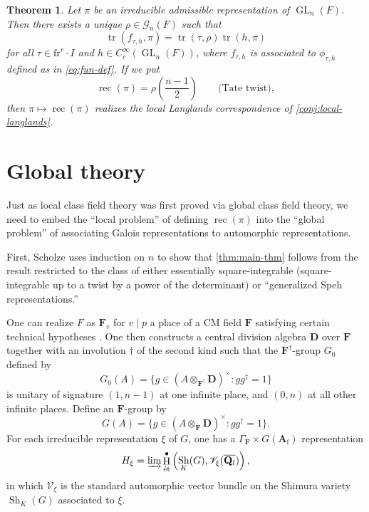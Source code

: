 \documentclass{article}
\DeclareMathOperator{\GL}{GL}
\DeclareMathOperator{\h}{H}
\DeclareMathOperator{\reciprocity}{rec}
\DeclareMathOperator{\shimura}{Sh}
\DeclareMathOperator{\trace}{tr}
\newcommand{\etale}{\textnormal{\'et}}
\newcommand{\finite}{\mathrm{f}}
\newcommand{\frob}{\mathrm{fr}} %
\newcommand{\cG}{\mathcal{G}}
\newcommand{\dA}{\mathbf{A}}
\newcommand{\dD}{\mathbf{D}}
\newcommand{\dF}{\mathbf{F}}
\newcommand{\dQ}{\mathbf{Q}}
\newcommand{\sV}{\mathscr{V}}
\newtheorem{theorem}[subsection]{Theorem}
\begin{document}
\begin{theorem}\label{thm:main-thm}
Let $\pi$ be an irreducible admissible representation of $\GL_n(F)$. Then there 
exists a unique $\rho\in \cG_n(F)$ such that 
\[
  \trace(f_{\tau,h},\pi) = \trace(\tau,\rho)\trace(h,\pi) 
\]
for all $\tau\in \frob^r\cdot I$ and $h\in C_c^\infty(\GL_n(F))$, where 
$f_{\tau,h}$ is associated to $\phi_{\tau,h}$ defined as in 
\eqref{eq:fun-def}. If we put 
\[
  \reciprocity(\pi) = \rho\left(\frac{n-1}{2}\right) \qquad \text{(Tate twist)},
\]
then $\pi\mapsto \reciprocity(\pi)$ realizes the local Langlands correspondence 
of \autoref{conj:local-langlands}. 
\end{theorem}





\section{Global theory}

Just as local class field theory was first proved via global class field 
theory, we need to embed the ``local problem'' of defining 
$\reciprocity(\pi)$ into the ``global problem'' of associating Galois 
representations to automorphic representations. 

First, Scholze uses induction on $n$ to show that \autoref{thm:main-thm} 
follows from the result restricted to the class of either essentially 
square-integrable (square-integrable up to a twist by a power of the 
determinant) or ``generalized Speh representations.'' 

One can realize $F$ as $\dF_v$ for $v\mid p$ a place of a CM field $\dF$ 
satisfying certain technical hypotheses \cite[\S 8]{scholze-2013}. One then 
constructs a central division algebra $\dD$ over $\dF$ together with an 
involution $\dagger$ of the second kind such that the $\dF^\dagger$-group 
$G_0$ defined by 
\[
  G_0(A) = \{g\in (A\otimes_{\dF^\dagger} \dD)^\times:g g^\dagger = 1\}
\]
is unitary of signature $(1,n-1)$ at one infinite place, and $(0,n)$ at all 
other infinite places. Define an $\dF$-group by 
\[
  G(A) = \{g\in (A\otimes_\dF \dD)^\times:g g^\dagger = 1\} .
\]
For each irreducible representation $\xi$ of $G$, one has a 
$\Gamma_\dF\times G(\dA_\finite)$ representation 
\[
  H_\xi = \varinjlim \h^\bullet_\etale\left(\shimura_K(G), \sV_\xi(\overline{\dQ_l})\right) ,
\]
in which $\sV_\xi$ is the standard automorphic vector bundle on the Shimura 
variety $\shimura_K(G)$ associated to $\xi$. 
\end{document}
